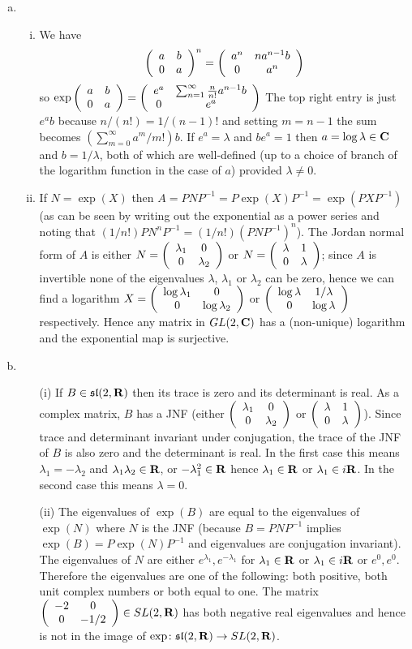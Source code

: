 \documentclass[12pt]{article}
\begin{document}
\begin{answer}
\begin{enumerate}[(a)]
\item \begin{enumerate}[(i)]
\item We have
\[\left(\begin{array}{cc}a & b\\ 0 & a\end{array}\right)^n=\left(\begin{array}{cc}a^n & na^{n-1}b\\ 0 & a^n\end{array}\right)\]
so $\exp\left(\begin{array}{cc}a & b\\ 0 & a\end{array}\right)=\left(\begin{array}{cc}e^a & \sum_{n=1}^{\infty}\frac{n}{n!}a^{n-1}b\\ 0 & e^a\end{array}\right)$ The top right entry is just $e^ab$ because $n/(n!)=1/(n-1)!$ and setting $m=n-1$ the sum becomes $(\sum_{m=0}^{\infty}a^m/m!)b$. If $e^a=\lambda$ and $be^a=1$ then $a=\log\lambda\in\mathbf{C}$ and $b=1/\lambda$, both of which are well-defined (up to a choice of branch of the logarithm function in the case of $a$) provided $\lambda\neq 0$.
\item If $N=\exp(X)$ then $A=PNP^{-1}=P\exp(X)P^{-1}=\exp(PXP^{-1})$ (as can be seen by writing out the exponential as a power series and noting that $(1/n!)PN^nP^{-1}=(1/n!)(PNP^{-1})^n$). The Jordan normal form of $A$ is either $N=\left(\begin{array}{cc}\lambda_1 & 0\\ 0 & \lambda_2\end{array}\right)$ or $N=\left(\begin{array}{cc}\lambda & 1\\ 0 & \lambda\end{array}\right)$; since $A$ is invertible none of the eigenvalues $\lambda$, $\lambda_1$ or $\lambda_2$ can be zero, hence we can find a logarithm $X=\left(\begin{array}{cc}\log\lambda_1 & 0\\ 0 & \log\lambda_2\end{array}\right)$ or $\left(\begin{array}{cc}\log\lambda & 1/\lambda\\ 0 & \log\lambda\end{array}\right)$ respectively. Hence any matrix in $GL(2,\mathbf{C})$ has a (non-unique) logarithm and the exponential map is surjective.
\end{enumerate}
\item
\begin{enumerate}
\item[(i)] If $B\in\mathfrak{sl}(2,\mathbf{R})$ then its trace is zero and its determinant is real. As a complex matrix, $B$ has a JNF (either $\left(\begin{array}{cc}\lambda_1 & 0\\ 0 & \lambda_2\end{array}\right)$ or $\left(\begin{array}{cc}\lambda & 1\\ 0 & \lambda\end{array}\right)$). Since trace and determinant invariant under conjugation, the trace of the JNF of $B$ is also zero and the determinant is real. In the first case this means $\lambda_1=-\lambda_2$ and $\lambda_1\lambda_2\in\mathbf{R}$, or $-\lambda_1^2\in\mathbf{R}$ hence $\lambda_1\in\mathbf{R}$ or $\lambda_1\in i\mathbf{R}$. In the second case this means $\lambda=0$.
\item[(ii)] The eigenvalues of $\exp(B)$ are equal to the eigenvalues of $\exp(N)$ where $N$ is the JNF (because $B=PNP^{-1}$ implies $\exp(B)=P\exp(N)P^{-1}$ and eigenvalues are conjugation invariant). The eigenvalues of $N$ are either $e^{\lambda_1},e^{-\lambda_1}$ for $\lambda_1\in\mathbf{R}$ or $\lambda_1\in i\mathbf{R}$ or $e^0,e^0$. Therefore the eigenvalues are one of the following: both positive, both unit complex numbers or both equal to one. The matrix $\left(\begin{array}{cc}-2 & 0\\ 0 & -1/2\end{array}\right)\in SL(2,\mathbf{R})$ has both negative real eigenvalues and hence is not in the image of $\exp\colon\mathfrak{sl}(2,\mathbf{R})\to SL(2,\mathbf{R})$.
\end{enumerate}
\end{enumerate}
\end{answer}
\newpage
\end{document}
